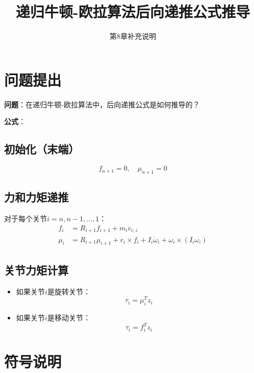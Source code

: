 \documentclass[12pt,a4paper]{article}
\title{递归牛顿-欧拉算法后向递推公式推导}
\author{第8章补充说明}
\date{}
\begin{document}
\maketitle

\section{问题提出}

\textbf{问题}：在递归牛顿-欧拉算法中，后向递推公式是如何推导的？

\textbf{公式}：

\subsection{初始化（末端）}

\begin{equation}
f_{n+1} = 0, \quad \mu_{n+1} = 0
\end{equation}

\subsection{力和力矩递推}

对于每个关节$i = n, n-1, \ldots, 1$：
\begin{align}
f_i &= R_{i+1} f_{i+1} + m_i \dot{v}_{c,i} \tag{24} \\
\mu_i &= R_{i+1} \mu_{i+1} + r_i \times f_i + I_i \dot{\omega}_i + \omega_i \times (I_i \omega_i) \tag{25}
\end{align}

\subsection{关节力矩计算}

\begin{itemize}
\item 如果关节$i$是旋转关节：
\begin{equation}
\tau_i = \mu_i^T z_i \tag{26}
\end{equation}

\item 如果关节$i$是移动关节：
\begin{equation}
\tau_i = f_i^T z_i \tag{27}
\end{equation}
\end{itemize}

\section{符号说明}
\end{document}
